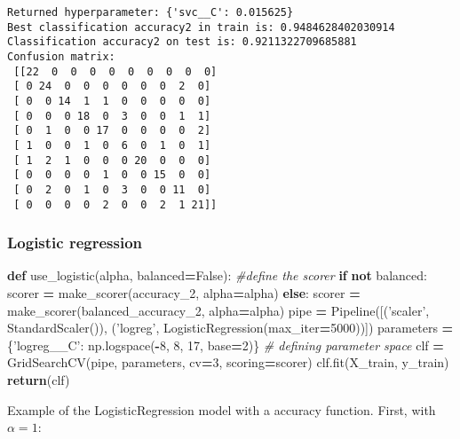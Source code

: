 \documentclass[10pt,a4paper]{article}
\newenvironment{Shaded}{\begin{snugshade}}{\end{snugshade}}
\newcommand{\CommentTok}[1]{\textcolor[rgb]{0.56,0.35,0.01}{\textit{#1}}}
\newcommand{\ControlFlowTok}[1]{\textcolor[rgb]{0.13,0.29,0.53}{\textbf{#1}}}
\newcommand{\DecValTok}[1]{\textcolor[rgb]{0.00,0.00,0.81}{#1}}
\newcommand{\KeywordTok}[1]{\textcolor[rgb]{0.13,0.29,0.53}{\textbf{#1}}}
\newcommand{\NormalTok}[1]{#1}
\newcommand{\OperatorTok}[1]{\textcolor[rgb]{0.81,0.36,0.00}{\textbf{#1}}}
\newcommand{\StringTok}[1]{\textcolor[rgb]{0.31,0.60,0.02}{#1}}
\newcommand{\VariableTok}[1]{\textcolor[rgb]{0.00,0.00,0.00}{#1}}
\theoremstyle{break}
\begin{document}
\begin{verbatim}
Returned hyperparameter: {'svc__C': 0.015625}
Best classification accuracy2 in train is: 0.9484628402030914
Classification accuracy2 on test is: 0.9211322709685881
Confusion matrix: 
 [[22  0  0  0  0  0  0  0  0  0]
 [ 0 24  0  0  0  0  0  0  2  0]
 [ 0  0 14  1  1  0  0  0  0  0]
 [ 0  0  0 18  0  3  0  0  1  1]
 [ 0  1  0  0 17  0  0  0  0  2]
 [ 1  0  0  1  0  6  0  1  0  1]
 [ 1  2  1  0  0  0 20  0  0  0]
 [ 0  0  0  0  1  0  0 15  0  0]
 [ 0  2  0  1  0  3  0  0 11  0]
 [ 0  0  0  0  2  0  0  2  1 21]]
\end{verbatim}

\hypertarget{logistic-regression}{%
\subsubsection{Logistic regression}\label{logistic-regression}}

\begin{Shaded}
\begin{Highlighting}[]
\KeywordTok{def}\NormalTok{ use_logistic(alpha, balanced}\OperatorTok{=}\VariableTok{False}\NormalTok{):}
    \CommentTok{#define the scorer}
    \ControlFlowTok{if} \KeywordTok{not}\NormalTok{ balanced:}
\NormalTok{        scorer }\OperatorTok{=}\NormalTok{ make_scorer(accuracy_2, alpha}\OperatorTok{=}\NormalTok{alpha)}
    \ControlFlowTok{else}\NormalTok{:}
\NormalTok{        scorer }\OperatorTok{=}\NormalTok{ make_scorer(balanced_accuracy_2, alpha}\OperatorTok{=}\NormalTok{alpha)  }
\NormalTok{    pipe }\OperatorTok{=}\NormalTok{ Pipeline([(}\StringTok{'scaler'}\NormalTok{, StandardScaler()), (}\StringTok{'logreg'}\NormalTok{, LogisticRegression(max_iter}\OperatorTok{=}\DecValTok{5000}\NormalTok{))])}
\NormalTok{    parameters }\OperatorTok{=}\NormalTok{ \{}\StringTok{'logreg__C'}\NormalTok{: np.logspace(}\OperatorTok{-}\DecValTok{8}\NormalTok{, }\DecValTok{8}\NormalTok{, }\DecValTok{17}\NormalTok{, base}\OperatorTok{=}\DecValTok{2}\NormalTok{)\} }\CommentTok{# defining parameter space}
\NormalTok{    clf }\OperatorTok{=}\NormalTok{ GridSearchCV(pipe, parameters, cv}\OperatorTok{=}\DecValTok{3}\NormalTok{, scoring}\OperatorTok{=}\NormalTok{scorer)}
\NormalTok{    clf.fit(X_train, y_train)}
    \ControlFlowTok{return}\NormalTok{(clf)}
\end{Highlighting}
\end{Shaded}

Example of the LogisticRegression model with a accuracy function. First, with \(\alpha = 1\):
\end{document}
